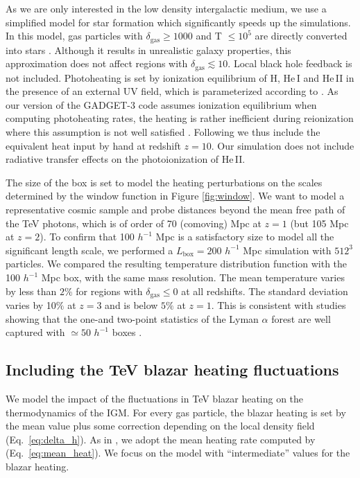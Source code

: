 \documentclass[numberedappendix]{emulateapj}
\begin{document}
As we are only interested in the low density intergalactic medium, we use a simplified model for star formation which significantly speeds up the simulations. In this model, gas particles with $\delta_{\mathrm{gas}}\geq 1000$ and T $\leq 10^5$ are directly converted into stars \citep{2004MNRAS.354..684V}. Although it results in unrealistic galaxy properties, this approximation does not affect regions with $\delta_{\mathrm{gas}} \lesssim 10$. Local black hole feedback is not included. Photoheating is set by ionization equilibrium of H, He\,\textsc{I} and He\,\textsc{II} in the presence of an external UV field, which is parameterized according to \citet{2009ApJ...703.1416F}. As our version of the \textsc{GADGET-3} code assumes ionization equilibrium when computing photoheating rates, the heating is rather inefficient during reionization where this assumption is not well satisfied \citep[see e.g.][]{2014arXiv1410.1531P}. Following \citet{2012MNRAS.423..149P} we thus include the equivalent heat input by hand at redshift $z=10$. Our simulation does not include radiative transfer effects on the photoionization of He\,\textsc{II}.

The size of the box is set to model the heating perturbations on the scales determined by the window function in Figure \ref{fig:window}. We want to model a representative cosmic sample and probe distances beyond the mean free path of the TeV photons, which is of order of 70 (comoving) Mpc at $z=1$ (but 105 Mpc at $z=2$). To confirm that 100 $h^{-1}$ Mpc is a satisfactory size to model all the significant length scale, we performed a $L_\mathrm{box}=200 $ $h^{-1}$ Mpc simulation with $512^3$ particles. We compared the resulting temperature distribution function with the 100 $h^{-1}$ Mpc box, with the same mass resolution. The mean temperature varies by less than $2\%$ for regions with $\delta_{\mathrm{gas}}\leqslant 0$ at all redshifts. The standard deviation varies by 10$\%$ at $z=3$ and is below $5\%$ at $z=1$. This is consistent with studies showing that the one-and two-point statistics of the Lyman $\alpha$ forest are well captured with $\simeq 50$ $h^{-1}$ boxes \citep{2007MNRAS.374..196R,2009MNRAS.398L..26B}.
\subsection{Including the TeV blazar heating fluctuations}
We model the impact of the fluctuations in TeV blazar heating on the thermodynamics of the IGM. For every gas particle, the blazar heating is set by the mean value plus some correction depending on the local density field (Eq.~\eqref{eq:delta_h}). As in \citet{2012MNRAS.423..149P}, we adopt the mean heating rate computed by \citet{2012ApJ...752...23C} (Eq.~\eqref{eq:mean_heat}). We focus on the model with ``intermediate'' values for the blazar heating.
\end{document}
